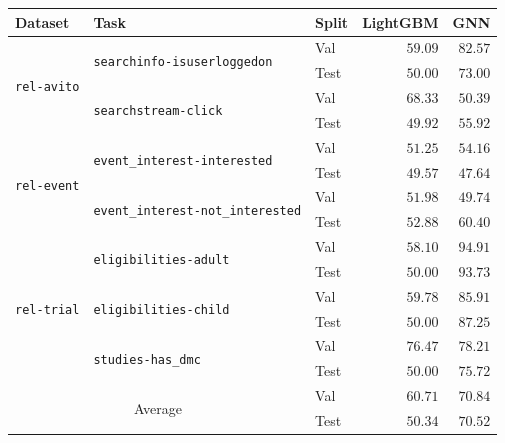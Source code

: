 \begin{tabular}{lllrr}
\toprule
Dataset & Task & Split & LightGBM & GNN \\
\midrule
\multirow[c]{4}{*}{\texttt{rel-avito}} & \multirow[c]{2}{*}{\texttt{searchinfo-isuserloggedon}} & Val & $59.09$ & $\bm{82.57}$ \\
 &  & Test & $50.00$ & $\bm{73.00}$ \\
\cmidrule{2-5}
 & \multirow[c]{2}{*}{\texttt{searchstream-click}} & Val & $\bm{68.33}$ & $50.39$ \\
 &  & Test & $49.92$ & $\bm{55.92}$ \\
\cmidrule{1-5} \cmidrule{2-5}
\multirow[c]{4}{*}{\texttt{rel-event}} & \multirow[c]{2}{*}{\texttt{event\_interest-interested}} & Val & $51.25$ & $\bm{54.16}$ \\
 &  & Test & $49.57$ & $47.64$ \\
\cmidrule{2-5}
 & \multirow[c]{2}{*}{\texttt{event\_interest-not\_interested}} & Val & $51.98$ & $49.74$ \\
 &  & Test & $52.88$ & $\bm{60.40}$ \\
\cmidrule{1-5} \cmidrule{2-5}
\multirow[c]{6}{*}{\texttt{rel-trial}} & \multirow[c]{2}{*}{\texttt{eligibilities-adult}} & Val & $58.10$ & $\bm{94.91}$ \\
 &  & Test & $50.00$ & $\bm{93.73}$ \\
\cmidrule{2-5}
 & \multirow[c]{2}{*}{\texttt{eligibilities-child}} & Val & $59.78$ & $\bm{85.91}$ \\
 &  & Test & $50.00$ & $\bm{87.25}$ \\
\cmidrule{2-5}
 & \multirow[c]{2}{*}{\texttt{studies-has\_dmc}} & Val & $76.47$ & $\bm{78.21}$ \\
 &  & Test & $50.00$ & $\bm{75.72}$ \\
\cmidrule{1-5} \cmidrule{2-5}
\multicolumn{2}{c}{\multirow{2}{*}{Average}} & Val & $60.71$ & $\bm{70.84}$ \\
 &  & Test & $50.34$ & $\bm{70.52}$ \\
\bottomrule
\end{tabular}
